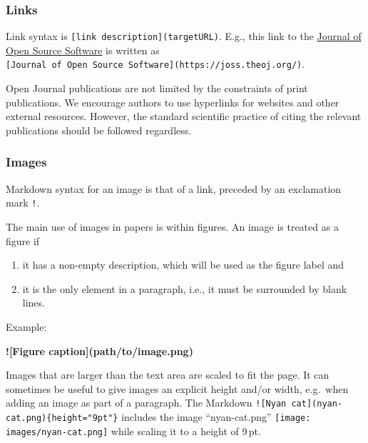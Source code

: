\documentclass[
]{article}
\newenvironment{Shaded}{}{}
\newcommand{\AlertTok}[1]{\textcolor[rgb]{1.00,0.00,0.00}{\textbf{#1}}}
\providecommand{\tightlist}{%
  \setlength{\itemsep}{0pt}\setlength{\parskip}{0pt}}
\begin{document}
\hypertarget{links}{%
\subsubsection{Links}\label{links}}

Link syntax is \texttt{{[}link\ description{]}(targetURL)}. E.g., this
link to the \href{https://joss.theoj.org/}{Journal of Open Source
Software} is written as\\
\texttt{{[}Journal\ of\ Open\ Source\ Software{]}(https://joss.theoj.org/)}.

Open Journal publications are not limited by the constraints of print
publications. We encourage authors to use hyperlinks for websites and
other external resources. However, the standard scientific practice of
citing the relevant publications should be followed regardless.

\hypertarget{images}{%
\subsubsection{Images}\label{images}}

Markdown syntax for an image is that of a link, preceded by an
exclamation mark \texttt{!}.

The main use of images in papers is within figures. An image is treated
as a figure if

\begin{enumerate}
\def\labelenumi{\arabic{enumi}.}
\tightlist
\item
  it has a non-empty description, which will be used as the figure label
  and
\item
  it is the only element in a paragraph, i.e., it must be surrounded by
  blank lines.
\end{enumerate}

Example:

\begin{Shaded}
\begin{Highlighting}[]
\AlertTok{![Figure caption](path/to/image.png)}
\end{Highlighting}
\end{Shaded}

Images that are larger than the text area are scaled to fit the page. It
can sometimes be useful to give images an explicit height and/or width,
e.g.~when adding an image as part of a paragraph. The Markdown
\texttt{!{[}Nyan\ cat{]}(nyan-cat.png)\{height="9pt"\}} includes the
image ``nyan-cat.png''
\texttt{[image: images/nyan-cat.png]}
while scaling it to a height of 9\,pt.
\end{document}
